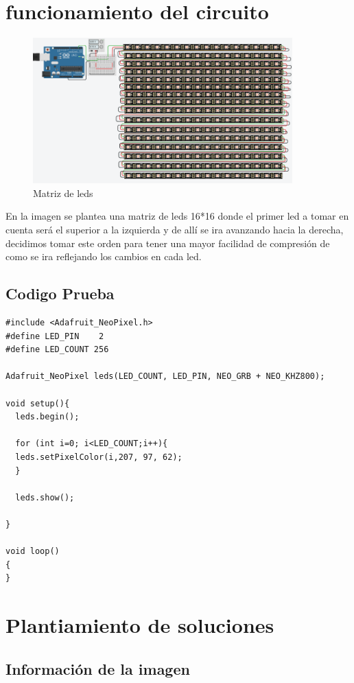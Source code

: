 \documentclass{article}
\begin{document}
\section{funcionamiento del circuito} \label{contenido}

\begin{figure}[h]
\includegraphics[width=10cm]{Simulación.png}
\centering
\caption{Matriz de leds}
\label{fig:matriz de leds}
\end{figure}

\label{contenio}
En la imagen se plantea una matriz de leds 16*16 donde el primer led a tomar en cuenta será el superior a la izquierda y de allí se ira avanzando hacia la derecha, decidimos tomar este orden para tener una mayor facilidad de compresión de como se ira reflejando los cambios en cada led.

\subsection{Codigo Prueba }
\begin{lstlisting}[language=arduino, label=codigo_ejemplo]
#include <Adafruit_NeoPixel.h>
#define LED_PIN    2
#define LED_COUNT 256

Adafruit_NeoPixel leds(LED_COUNT, LED_PIN, NEO_GRB + NEO_KHZ800);

void setup(){
  leds.begin();
  
  for (int i=0; i<LED_COUNT;i++){
  leds.setPixelColor(i,207, 97, 62);
  }

  leds.show();
  
}

void loop()
{
}
\end{lstlisting}
\section{Plantiamiento de soluciones }

\subsection{Información de la imagen  }
\end{document}
